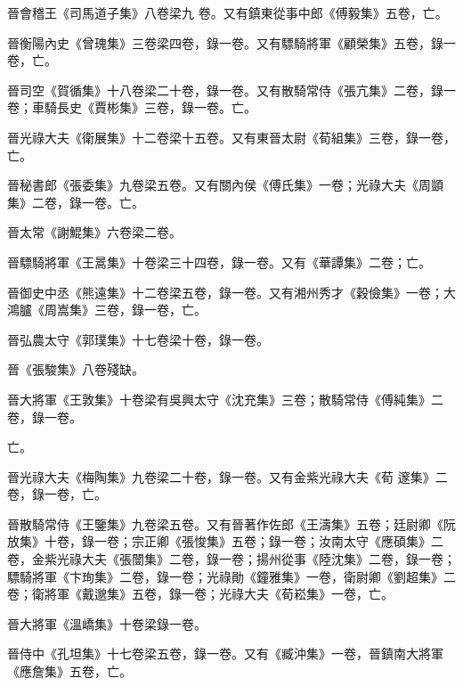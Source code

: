 \begin{pinyinscope}
 晉會稽王《司馬道子集》八卷梁九
 卷。又有鎮東從事中郎《傅毅集》五卷，亡。



 晉衡陽內史《曾瑰集》三卷梁四卷，錄一卷。又有驃騎將軍《顧榮集》五卷，錄一卷，亡。



 晉司空《賀循集》十八卷梁二十卷，錄一卷。又有散騎常侍《張亢集》二卷，錄一卷；車騎長史《賈彬集》三卷，錄一卷。亡。



 晉光祿大夫《衛展集》十二卷梁十五卷。又有東晉太尉《荀組集》三卷，錄一卷，亡。



 晉秘書郎《張委集》九卷梁五卷。又有關內侯《傅氏集》一卷；光祿大夫《周顗集》二卷，錄一卷。亡。



 晉太常《謝鯤集》六卷梁二卷。



 晉驃騎將軍《王暠集》十卷梁三十四卷，錄一卷。又有《華譚集》二卷；亡。



 晉御史中丞《熊遠集》十二卷梁五卷，錄一卷。又有湘州秀才《穀儉集》一卷；大鴻臚《周嵩集》三卷，錄一卷，亡。



 晉弘農太守《郭璞集》十七卷梁十卷，錄一卷。



 晉《張駿集》八卷殘缺。



 晉大將軍《王敦集》十卷梁有吳興太守《沈充集》三卷；散騎常侍《傅純集》二卷，錄一卷。



 亡。



 晉光祿大夫《梅陶集》九卷梁二十卷，錄一卷。又有金紫光祿大夫《荀
 邃集》二卷，錄一卷，亡。



 晉散騎常侍《王鑒集》九卷梁五卷。又有晉著作佐郎《王濤集》五卷；廷尉卿《阮放集》十卷，錄一卷；宗正卿《張悛集》五卷；錄一卷；汝南太守《應碩集》二卷，金紫光祿大夫《張闓集》二卷，錄一卷；揚州從事《陸沈集》二卷，錄一卷；驃騎將軍《卞珣集》二卷，錄一卷；光祿勛《鐘雅集》一卷，衛尉卿《劉超集》二卷；衛將軍《戴邈集》五卷，錄一卷；光祿大夫《荀崧集》一卷，亡。



 晉大將軍《溫嶠集》十卷梁錄一卷。



 晉侍中《孔坦集》十七卷梁五卷，錄一卷。又有《臧沖集》一卷，晉鎮南大將軍《應詹集》五卷，亡。




\end{pinyinscope}
